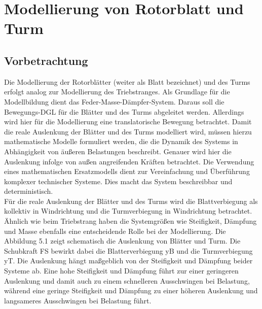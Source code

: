 \section{Modellierung von Rotorblatt und Turm} \label{turm_blatt}

\subsection{Vorbetrachtung}
Die Modellierung der Rotorblätter (weiter als Blatt bezeichnet) und des Turms erfolgt analog zur Modellierung des Triebstranges. Als Grundlage für die Modellbildung dient das Feder-Masse-Dämpfer-System. Daraus soll die Bewegungs-DGL für die Blätter und des Turms abgeleitet werden. Allerdings wird hier für die Modellierung eine translatorische Bewegung betrachtet. Damit die reale Auslenkung der Blätter und des Turms modelliert wird, müssen hierzu mathematische Modelle formuliert werden, die die Dynamik des Systems in Abhängigkeit von äußeren Belastungen beschreibt. Genauer wird hier die Auslenkung infolge von außen angreifenden Kräften betrachtet. Die Verwendung eines mathematischen Ersatzmodells dient zur Vereinfachung und Überführung komplexer technischer Systeme. Dies macht das System beschreibbar und deterministisch. 
\\
Für die reale Auslenkung der Blätter und des Turms wird die Blattverbiegung als kollektiv in Windrichtung und die Turmverbiegung in Windrichtung betrachtet. Ähnlich wie beim Triebstrang haben die Systemgrößen wie Steifigkeit, Dämpfung und Masse ebenfalls eine entscheidende Rolle bei der Modellierung. Die Abbildung 5.1 zeigt schematisch die Auslenkung von Blätter und Turm. Die Schubkraft \acs{FS} bewirkt dabei die Blatterverbiegung \acs{yB} und die Turmverbiegung \acs{yT}. Die Auslenkung hängt maßgeblich von der Steifigkeit und Dämpfung beider Systeme ab. Eine hohe Steifigkeit und Dämpfung führt zur einer geringeren Auslenkung und damit auch zu einem schnelleren Ausschwingen bei Belastung, während eine geringe Steifigkeit und Dämpfung zu einer höheren Auslenkung und langsameres Ausschwingen bei Belastung führt.
